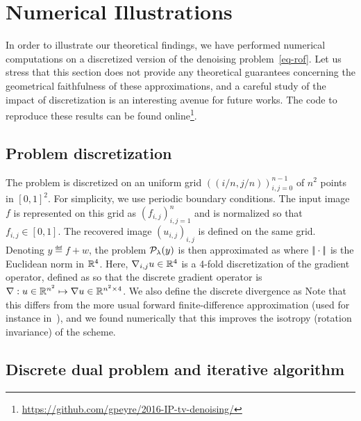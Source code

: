 
\section{Numerical Illustrations}\label{sec:numerics}

In order to illustrate our theoretical findings, we have performed numerical computations on a discretized version of the denoising problem~\eqref{eq-rof}. Let us stress that this section does not provide any theoretical guarantees concerning the geometrical faithfulness of these approximations, and a careful study of the impact of discretization is an interesting avenue for future works. The code to reproduce these results can be found online\footnote{\url{https://github.com/gpeyre/2016-IP-tv-denoising/}}.

\subsection{Problem discretization}

The problem is discretized on an uniform grid $( (i/n,j/n) )_{i,j=0}^{n-1}$ of $n^2$ points in $[0,1]^2$. For simplicity, we use periodic boundary conditions. The input image $f$ is represented on this grid as $(f_{i,j})_{i,j=1}^n$ and is normalized so that $f_{i,j} \in [0,1]$. The recovered image $(u_{i,j})_{i,j}$ is defined on the same grid. Denoting $y \eqdef f+w$, the problem $\mathcal{P}_{\lambda}(y)$ is then approximated as
where $|\!| \cdot |\!|$ is the Euclidean norm in $\mathbb{R}^4$.
%
Here, $\nabla_{i,j} u \in \mathbb{R}^4$ is a 4-fold discretization of the gradient operator, defined as
so that the discrete gradient operator is $\nabla : u \in \mathbb{R}^{n^2} \mapsto \nabla u \in \mathbb{R}^{n^2 \times 4}$.
%
We also define the discrete divergence as
%
Note that this differs from the more usual forward  finite-difference approximation (used for instance in~\cite{chambolle2004algorithm}), and we found numerically that this improves the isotropy (rotation invariance) of the scheme. 

\subsection{Discrete dual problem and iterative algorithm}

